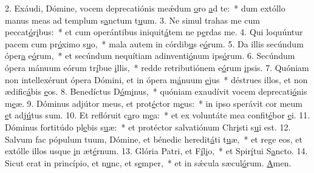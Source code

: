 2. Exáudi, Dómine, vocem deprecatiónis meǽdum \uline{o}ro \uline{a}d te:~* dum extóllo manus meas ad templum s\uline{a}nctum t\uline{u}um.
3. Ne simul trahas me cum peccat\uline{ó}r\uline{i}bus:~* et cum operántibus iniquit\uline{á}tem ne p\uline{e}rdas me.
4. Qui loquúntur pacem cum pr\uline{ó}ximo s\uline{u}o,~* mala autem in córdib\uline{u}s e\uline{ó}rum.
5. Da illis secúndum óper\uline{a} e\uline{ó}rum,~* et secúndum nequítiam adinventi\uline{ó}num ips\uline{ó}rum.
6. Secúndum ópera mánuum eórum tr\uline{í}bue \uline{i}llis,~* redde retributiónem e\uline{ó}rum \uline{i}psis.
7. Quóniam non intellexérunt ópera Dómini, et in ópera m\uline{á}nuum \uline{e}jus~* déstrues illos, et non ædific\uline{á}bis \uline{e}os.
8. Benedíctus D\uline{ó}m\uline{i}nus,~* quóniam exaudívit vocem deprecati\uline{ó}nis m\uline{e}æ.
9. Dóminus adjútor meus, et prot\uline{é}ctor m\uline{e}us:~* in ipso sperávit cor meum \uline{e}t adj\uline{ú}tus sum.
10. Et reflóruit c\uline{a}ro m\uline{e}a:~* et ex voluntáte mea confit\uline{é}bor \uline{e}i.
11. Dóminus fortitúdo pl\uline{e}bis s\uline{u}æ:~* et protéctor salvatiónum Chr\uline{i}sti s\uline{u}i est.
12. Salvum fac pópulum tuum, Dómine, et bénedic heredit\uline{á}ti t\uline{u}æ,~* et rege eos, et extólle illos usque \uline{i}n æt\uline{é}rnum.
13. Glória Patri, et F\uline{í}l\uline{i}o,~* et Spir\uline{í}tui S\uline{a}ncto.
14. Sicut erat in princípio, et n\uline{u}nc, et s\uline{e}mper,~* et in sǽcula sæcul\uline{ó}rum. \uline{A}men.
